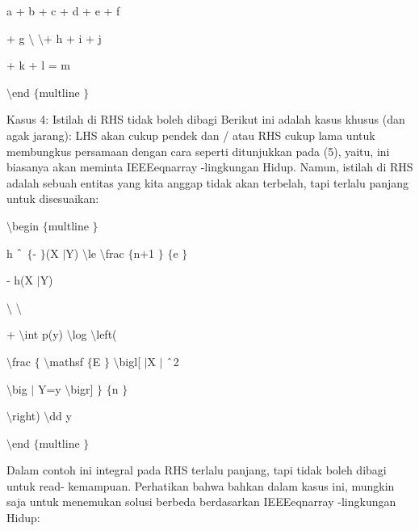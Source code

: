 \vspace{12pt}
\noindent 
a + b + c + d + e + f \par
\vspace{12pt}
\noindent 
+ g  $  \setminus  $ $  \setminus  $+ h + i + j \par
\vspace{12pt}
\noindent 
+ k + l = m \par
\vspace{12pt}
\noindent 
 $  \setminus  $end $  \{  $multline $  \}  $ \par
\vspace{12pt}
\noindent 
Kasus 4: Istilah di RHS tidak boleh dibagi Berikut ini adalah kasus khusus (dan agak jarang): LHS akan cukup pendek dan / atau RHS cukup lama untuk membungkus persamaan dengan cara seperti ditunjukkan pada (5), yaitu, ini biasanya akan meminta IEEEeqnarray -lingkungan Hidup. Namun, istilah di RHS adalah sebuah entitas yang kita anggap tidak akan terbelah, tapi terlalu panjang untuk disesuaikan: \par
\vspace{12pt}
\noindent 
 $  \setminus  $begin $  \{  $multline $  \}  $ \par
\vspace{12pt}
\noindent 
h $  \string^  $ $  \{  $- $  \}  $(X $  \vert  $Y)  $  \setminus  $le  $  \setminus  $frac $  \{  $n+1 $  \}  $ $  \{  $e $  \}  $ \par
\vspace{12pt}
\noindent 
- h(X $  \vert  $Y) \par
\vspace{12pt}
\noindent 
 $  \setminus  $ $  \setminus  $ \par
\noindent 
+  $  \setminus  $int p(y)  $  \setminus  $log  $  \setminus  $left( \par
\vspace{12pt}
\noindent 
 $  \setminus  $frac $  \{  $ $  \setminus  $mathsf $  \{  $E $  \}  $ $  \setminus  $bigl[ $  \vert  $X $  \vert  $ $  \string^  $2 \par
\vspace{12pt}
\noindent 
 $  \setminus  $big $  \vert  $ Y=y $  \setminus  $bigr] $  \}  $ $  \{  $n $  \}  $ \par
\vspace{12pt}
\noindent 
 $  \setminus  $right)  $  \setminus  $dd y \par
\noindent 
 $  \setminus  $end $  \{  $multline $  \}  $ \par
\noindent 
Dalam contoh ini integral pada RHS terlalu panjang, tapi tidak boleh dibagi untuk read- kemampuan. Perhatikan bahwa bahkan dalam kasus ini, mungkin saja untuk menemukan solusi berbeda berdasarkan IEEEeqnarray -lingkungan Hidup: \par
